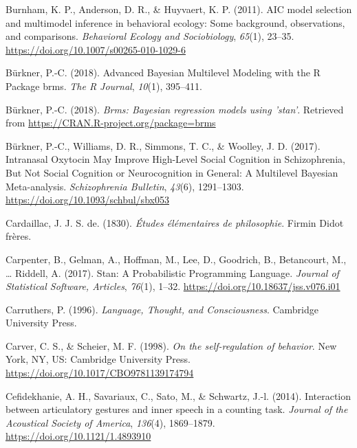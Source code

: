 \documentclass[a4paper,12pt,twoside,openright,oldfontcommands,final]{memoir}
\begin{document}
\leavevmode\hypertarget{ref-burnham_aic_2011}{}%
Burnham, K. P., Anderson, D. R., \& Huyvaert, K. P. (2011). AIC model selection and multimodel inference in behavioral ecology: Some background, observations, and comparisons. \emph{Behavioral Ecology and Sociobiology}, \emph{65}(1), 23--35. \url{https://doi.org/10.1007/s00265-010-1029-6}

\leavevmode\hypertarget{ref-burkner_advanced_2018}{}%
Bürkner, P.-C. (2018). Advanced Bayesian Multilevel Modeling with the R Package brms. \emph{The R Journal}, \emph{10}(1), 395--411.

\leavevmode\hypertarget{ref-R-brms}{}%
Bürkner, P.-C. (2018). \emph{Brms: Bayesian regression models using 'stan'}. Retrieved from \url{https://CRAN.R-project.org/package=brms}

\leavevmode\hypertarget{ref-burkner_intranasal_2017}{}%
Bürkner, P.-C., Williams, D. R., Simmons, T. C., \& Woolley, J. D. (2017). Intranasal Oxytocin May Improve High-Level Social Cognition in Schizophrenia, But Not Social Cognition or Neurocognition in General: A Multilevel Bayesian Meta-analysis. \emph{Schizophrenia Bulletin}, \emph{43}(6), 1291--1303. \url{https://doi.org/10.1093/schbul/sbx053}

\leavevmode\hypertarget{ref-cardaillac_etudes_1830}{}%
Cardaillac, J. J. S. de. (1830). \emph{Études élémentaires de philosophie}. Firmin Didot frères.

\leavevmode\hypertarget{ref-carpenter_stan_2017}{}%
Carpenter, B., Gelman, A., Hoffman, M., Lee, D., Goodrich, B., Betancourt, M., \ldots{} Riddell, A. (2017). Stan: A Probabilistic Programming Language. \emph{Journal of Statistical Software, Articles}, \emph{76}(1), 1--32. \url{https://doi.org/10.18637/jss.v076.i01}

\leavevmode\hypertarget{ref-carruthers_language_1996}{}%
Carruthers, P. (1996). \emph{Language, Thought, and Consciousness}. Cambridge University Press.

\leavevmode\hypertarget{ref-carver_self-regulation_1998}{}%
Carver, C. S., \& Scheier, M. F. (1998). \emph{On the self-regulation of behavior}. New York, NY, US: Cambridge University Press. \url{https://doi.org/10.1017/CBO9781139174794}

\leavevmode\hypertarget{ref-cefidekhanie_interaction_2014}{}%
Cefidekhanie, A. H., Savariaux, C., Sato, M., \& Schwartz, J.-l. (2014). Interaction between articulatory gestures and inner speech in a counting task. \emph{Journal of the Acoustical Society of America}, \emph{136}(4), 1869--1879. \url{https://doi.org/10.1121/1.4893910}
\end{document}
